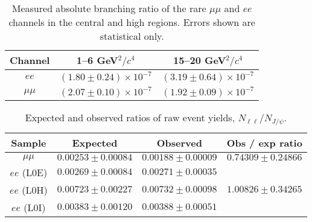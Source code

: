 \begin{table}[h]
\centering
\caption{Measured absolute branching ratio of the rare $\mu\mu$ and $ee$ channels in
the central and high \qsq regions. Errors shown are statistical only. }
\begin{tabular}{|c|c|c|}
\hline
 Channel 		& 1--6 GeV$^2/c^4$ & 15--20 GeV$^2/c^4$\\ \hline
$ee$ 		& $( 1.80  \pm  0.24 )\times 10^{-7}$ 	& $( 3.19  \pm  0.64 )\times 10^{-7}$ \\
 $\mu\mu$ 	& $( 2.07  \pm  0.10 )\times 10^{-7}$ 	& $( 1.92  \pm  0.09 )\times 10^{-7}$ \\
\hline 
 \end{tabular}

\label{tab:RKst_abs_BR}
\end{table}
%
\begin{table}[h]
\centering
 \caption{Expected and observed ratios of raw event yields, $N_{\ell\ell} / N_{J/\psi}$. }
\begin{tabular}{|c|c|c|c|}
\hline
 Sample 			& Expected 			& Observed 			& Obs / exp ratio \\ \hline
$\mu\mu$ 	& $ 0.00253  \pm  0.00084 $ 	& $ 0.00188  \pm  0.00009 $ 	& $ 0.74309  \pm  0.24866 $ \\
\hline
$ee$ (L0E) 	& $ 0.00269  \pm  0.00084 $ 	& $ 0.00271  \pm  0.00035 $ 	&  \\
$ee$ (L0H) 	& $ 0.00723  \pm  0.00227 $ 	& $ 0.00732  \pm  0.00098 $ 	& $ 1.00826  \pm  0.34265 $ \\
$ee$ (L0I) 	& $ 0.00383  \pm  0.00120 $ 	& $ 0.00388  \pm  0.00051 $ 	&  \\
\hline 
 \end{tabular}
 \label{tab:RKst_expectations}
\end{table}

\clearpage
